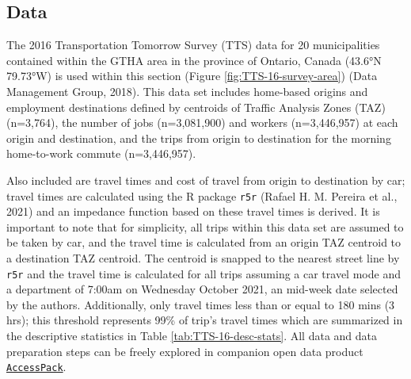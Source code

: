\documentclass[]{elsarticle} %
\begin{document}
\hypertarget{data}{%
\subsection{Data}\label{data}}

The 2016 Transportation Tomorrow Survey (TTS) data for 20 municipalities
contained within the GTHA area in the province of Ontario, Canada
(43.6°N 79.73°W) is used within this section (Figure
\ref{fig:TTS-16-survey-area}) (Data Management Group, 2018). This data
set includes home-based origins and employment destinations defined by
centroids of Traffic Analysis Zones (TAZ) (n=3,764), the number of jobs
(n=3,081,900) and workers (n=3,446,957) at each origin and destination,
and the trips from origin to destination for the morning home-to-work
commute (n=3,446,957).

Also included are travel times and cost of travel from origin to
destination by car; travel times are calculated using the R package
\texttt{r5r} (Rafael H. M. Pereira et al., 2021) and an impedance
function based on these travel times is derived. It is important to note
that for simplicity, all trips within this data set are assumed to be
taken by car, and the travel time is calculated from an origin TAZ
centroid to a destination TAZ centroid. The centroid is snapped to the
nearest street line by \texttt{r5r} and the travel time is calculated
for all trips assuming a car travel mode and a department of 7:00am on
Wednesday October 2021, an mid-week date selected by the authors.
Additionally, only travel times less than or equal to 180 mins (3 hrs);
this threshold represents 99\% of trip's travel times which are
summarized in the descriptive statistics in Table
\ref{tab:TTS-16-desc-stats}. All data and data preparation steps can be
freely explored in companion open data product
\href{https://github.com/soukhova/AccessPack}{\texttt{AccessPack}}.
\end{document}
